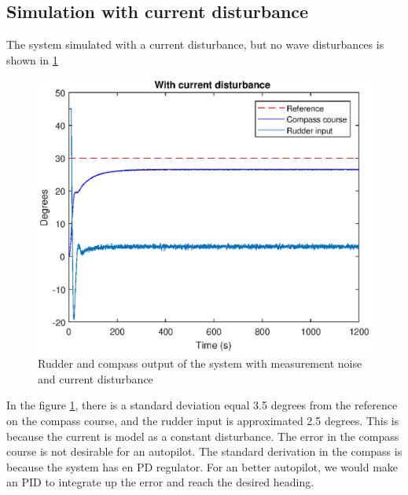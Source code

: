 \subsection{Simulation with current disturbance} \label{p3c}
The system simulated with a current disturbance, but no wave disturbances is shown in \cref{fig:p3c} 
\begin{figure}[H]
    \centering
    \includegraphics[width=0.6\linewidth]{Part3_pics/ny_3c.eps}
    \caption{Rudder and compass output of the system with measurement noise and current disturbance}
    \label{fig:p3c}
\end{figure}
In the figure \ref{fig:p3c}, there is a standard deviation equal 3.5 degrees from the reference on the compass course, and the rudder input is approximated 2.5 degrees. This is because the current is model as a constant disturbance. The error in the compass course is not desirable for an autopilot. The standard derivation in the compass is because the system has en PD regulator. For an better autopilot, we would make an PID to integrate up the error and reach the desired heading. 

